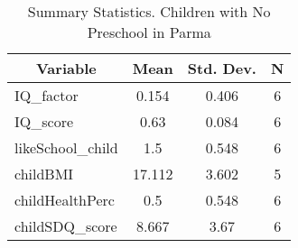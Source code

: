 
\begin{table}[htbp]\centering \caption{Summary Statistics. Children with No Preschool in Parma \label{bothChildmaternaNoneParma}}
\begin{tabular}{l c c  c}\hline\hline
\multicolumn{1}{c}{\textbf{Variable}} & \textbf{Mean}
 & \textbf{Std. Dev.} & \textbf{N}\\ \hline
IQ\_factor & 0.154 & 0.406  & 6\\
IQ\_score & 0.63 & 0.084  & 6\\
likeSchool\_child & 1.5 & 0.548  & 6\\
childBMI & 17.112 & 3.602  & 5\\
childHealthPerc & 0.5 & 0.548  & 6\\
childSDQ\_score & 8.667 & 3.67  & 6\\
\hline\end{tabular}
\end{table}
